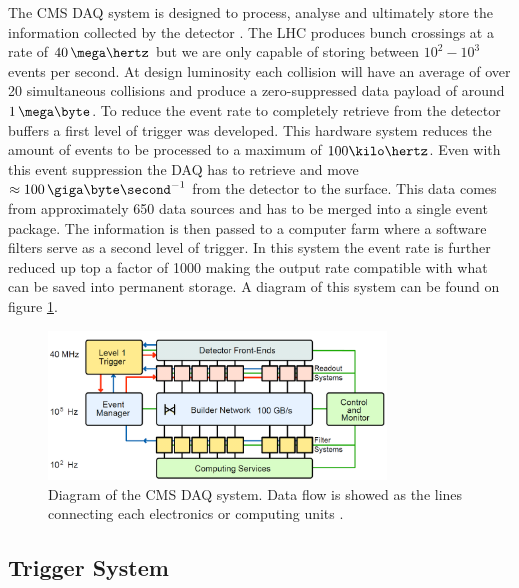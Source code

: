 The \gls{CMS} \gls{DAQ} system is designed to process, analyse and ultimately store the information collected by the detector \cite{CMSTDR:CMSTridasTDRVol2}. The \gls{LHC} produces bunch crossings at a rate of $40\,\mega\hertz$ but we are only capable of storing between $10^2-10^3$ events per second. At design luminosity each collision will have an average of over 20 simultaneous collisions and produce a zero-suppressed data payload of around $1\,\mega\byte$. To reduce the event rate to completely retrieve from the detector buffers a first level of trigger was developed. This hardware system reduces the amount of events to be processed to a maximum of $100 \kilo\hertz$. Even with this event suppression the \gls{DAQ} has to retrieve and move $\approx 100\, \giga\byte\second^{-1}$ from the detector to the surface. This data comes from approximately 650 data sources and has to be merged into a single event package. The information is then passed to a computer farm where a software filters serve as a second level of trigger. In this system the event rate is further reduced up top a factor of 1000 making the output rate compatible with what can be saved into permanent storage. A diagram of this system can be found on figure \ref{FIGURE:ExperimentalApparatus_CMS_DAQ_Diagram}.

\begin{figure}[!htb]
  \centering
  \includegraphics[width=0.80\textwidth]{Chapter02/CMS/Images/CMS_DAQ_Diagram.png}
  \caption{Diagram of the \gls{CMS} \gls{DAQ} system. Data flow is showed as the lines connecting each electronics or computing units \cite{ARTICLE:TheCMSExperiment}.}
  \label{FIGURE:ExperimentalApparatus_CMS_DAQ_Diagram}
\end{figure}

\subsection{Trigger System}
\label{SUBSECTION:ExperimentalApparatus_CMS_Trigger}

